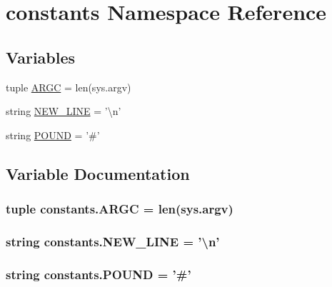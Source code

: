 \hypertarget{namespaceconstants}{\section{constants Namespace Reference}
\label{namespaceconstants}
}
\subsection*{Variables}
\begin{DoxyCompactItemize}
\item 
tuple \hyperlink{namespaceconstants_ad9add6f03319f70146cfb57ea8edc4d0}{A\-R\-G\-C} = len(sys.\-argv)
\item 
string \hyperlink{namespaceconstants_aebb023fe453986b48e2bb4a7bea0c395}{N\-E\-W\-\_\-\-L\-I\-N\-E} = '\textbackslash{}n'
\item 
string \hyperlink{namespaceconstants_a2c86dfb934138779059088d6b2fd006b}{P\-O\-U\-N\-D} = '\#'
\end{DoxyCompactItemize}


\subsection{Variable Documentation}
\hypertarget{namespaceconstants_ad9add6f03319f70146cfb57ea8edc4d0}{
\subsubsection[{A\-R\-G\-C}]{\setlength{\rightskip}{0pt plus 5cm}tuple constants.\-A\-R\-G\-C = len(sys.\-argv)}}\label{namespaceconstants_ad9add6f03319f70146cfb57ea8edc4d0}
\hypertarget{namespaceconstants_aebb023fe453986b48e2bb4a7bea0c395}{
\subsubsection[{N\-E\-W\-\_\-\-L\-I\-N\-E}]{\setlength{\rightskip}{0pt plus 5cm}string constants.\-N\-E\-W\-\_\-\-L\-I\-N\-E = '\textbackslash{}n'}}\label{namespaceconstants_aebb023fe453986b48e2bb4a7bea0c395}
\hypertarget{namespaceconstants_a2c86dfb934138779059088d6b2fd006b}{
\subsubsection[{P\-O\-U\-N\-D}]{\setlength{\rightskip}{0pt plus 5cm}string constants.\-P\-O\-U\-N\-D = '\#'}}\label{namespaceconstants_a2c86dfb934138779059088d6b2fd006b}
